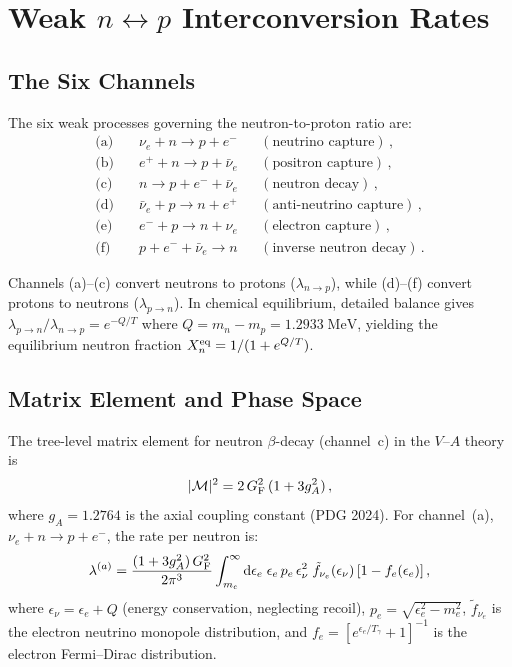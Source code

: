 \section{\texorpdfstring{Weak $n \leftrightarrow p$ Interconversion Rates}{Weak n<->p Interconversion Rates}}\label{sec:weak}

\subsection{The Six Channels}

The six weak processes governing the neutron-to-proton ratio are:
\begin{align}
\text{(a)}\quad &\nu_e + n \to p + e^- && (\text{neutrino capture})\,,\\
\text{(b)}\quad &e^+ + n \to p + \bar\nu_e && (\text{positron capture})\,,\\
\text{(c)}\quad &n \to p + e^- + \bar\nu_e && (\text{neutron decay})\,,\\
\text{(d)}\quad &\bar\nu_e + p \to n + e^+ && (\text{anti-neutrino capture})\,,\\
\text{(e)}\quad &e^- + p \to n + \nu_e && (\text{electron capture})\,,\\
\text{(f)}\quad &p + e^- + \bar\nu_e \to n && (\text{inverse neutron decay})\,.
\end{align}

Channels (a)--(c) convert neutrons to protons ($\lambda_{n\to p}$), while (d)--(f) convert protons to neutrons ($\lambda_{p\to n}$).  In chemical equilibrium, detailed balance gives $\lambda_{p\to n}/\lambda_{n\to p} = e^{-Q/T}$ where $Q = m_n - m_p = 1.2933\;\mathrm{MeV}$, yielding the equilibrium neutron fraction $X_n^{\rm eq} = 1/(1 + e^{Q/T})$.

\subsection{Matrix Element and Phase Space}

The tree-level matrix element for neutron $\beta$-decay (channel~c) in the $V$--$A$ theory is
\begin{equation}
|\mathcal{M}|^2 = 2\,G_{\rm F}^2\,(1 + 3g_A^2)\,,
\end{equation}
where $g_A = 1.2764$ is the axial coupling constant (PDG 2024).  For channel~(a), $\nu_e + n \to p + e^-$, the rate per neutron is:
\begin{equation}
\lambda^{(a)} = \frac{(1 + 3g_A^2)\,G_{\rm F}^2}{2\pi^3}\int_{m_e}^\infty \mathrm{d}\epsilon_e\;\epsilon_e\,p_e\,\epsilon_\nu^2\;\tilde{f}_{\nu_e}(\epsilon_\nu)\,[1 - f_e(\epsilon_e)]\,,\label{eq:lambda_a}
\end{equation}
where $\epsilon_\nu = \epsilon_e + Q$ (energy conservation, neglecting recoil), $p_e = \sqrt{\epsilon_e^2 - m_e^2}$, $\tilde{f}_{\nu_e}$ is the electron neutrino monopole distribution, and $f_e = [e^{\epsilon_e/T_\gamma} + 1]^{-1}$ is the electron Fermi--Dirac distribution.

